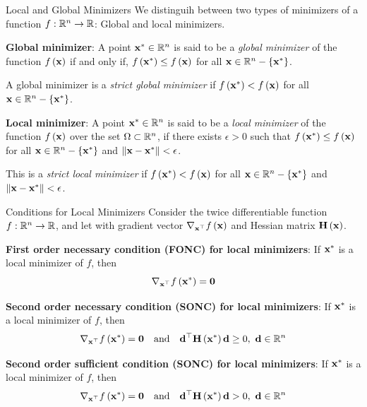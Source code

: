 \documentclass[aspectratio=169]{beamer}
\def\mf{\ensuremath\mathbf}
\def\mb{\ensuremath\mathbb}
\def\lp{\ensuremath\left(}
\def\rp{\ensuremath\right)}
\def\lc{\ensuremath\left\{}
\def\rc{\ensuremath\right\}}
\def\R{\ensuremath\mb{R}}
\newcommand{\ct}[1]{\lp #1\rp}
\begin{document}
\begin{frame}{Local and Global Minimizers}
  We distinguih between two types of minimizers of a function $f :\R^n \to \R$:  Global and local minimizers.
  \vspace{0.25cm}

  \textbf{Global minimizer}: A point $\mf{x}^* \in \R^n$ is said to be a \textit{global minimizer} of the function $f\ct{\mf{x}}$ if and only if, $f\ct{\mf{x}^*} \leq f\ct{\mf{x}}$ for all $\mf{x} \in \R^n - \lc \mf{x}^* \rc$. 
  \vspace{0.25cm}
  
  A global minimizer is a \textit{strict global minimizer} if $f\ct{\mf{x}^*} < f\ct{\mf{x}}$ for all $\mf{x} \in \R^n - \lc \mf{x}^* \rc$.
  \vspace{0.25cm}
  
  \textbf{Local minimizer}: A point $\mf{x}^* \in \R^n$ is said to be a \textit{local minimizer} of the function $f\ct{\mf{x}}$ over the set $\Omega \subset \R^n$, if there exists $\epsilon > 0$ such that $f\ct{\mf{x}^*} \leq f\ct{\mf{x}}$ for all $\mf{x} \in \R^n - \lc \mf{x}^* \rc$ and $\Vert \mf{x} - \mf{x}^*\Vert < \epsilon$. 
  \vspace{0.25cm}

  This is a \textit{strict local minimizer} if $f\ct{\mf{x}^*} < f\ct{\mf{x}}$ for all $\mf{x} \in \R^n - \lc \mf{x}^* \rc$ and $\Vert \mf{x} - \mf{x}^*\Vert < \epsilon$.
\end{frame}


\begin{frame}{Conditions for Local Minimizers}
  Consider the twice differentiable function $f: \R^n \to \R$, and let with gradient vector $\nabla_{\mf{x}^\top}f\ct{\mf{x}}$ and Hessian matrix $\mf{H}\ct{\mf{x}}$.
  \vspace{0.1cm}

  \textbf{First order necessary condition (FONC) for local minimizers}:
  If $\mf{x}^*$ is a local minimizer of $f$, then
  \[ \nabla_{\mf{x}^\top}f\ct{\mf{x^*}} = \mf{0} \]

  \textbf{Second order necessary condition (SONC) for local minimizers}:
  If $\mf{x}^*$ is a local minimizer of $f$, then
  \[ \nabla_{\mf{x}^\top}f\ct{\mf{x^*}} = \mf{0} \quad \text{and} \quad \mf{d}^\top\mf{H}\ct{\mf{x}^*}
  \mf{d} \geq 0, \,\, \mf{d} \in \R^n \]

  \textbf{Second order sufficient condition (SONC) for local minimizers}:
  If $\mf{x}^*$ is a local minimizer of $f$, then
  \[ \nabla_{\mf{x}^\top}f\ct{\mf{x^*}} = \mf{0} \quad \text{and} \quad \mf{d}^\top\mf{H}\ct{\mf{x}^*}
  \mf{d} > 0, \,\, \mf{d} \in \R^n \]
\end{frame}
\end{document}
